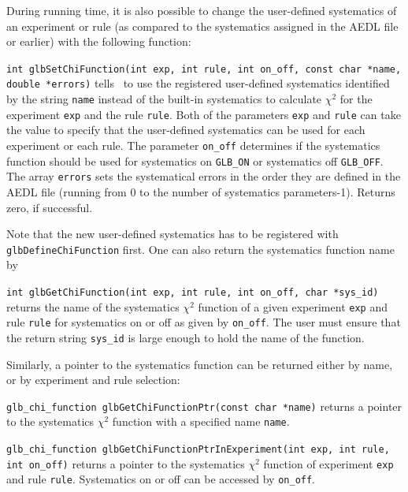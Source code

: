 During running time, it is also possible to change the user-defined systematics of an experiment or
rule (as compared to the systematics assigned in the AEDL file or earlier) with the following function:
\begin{function}
{\tt int glbSetChiFunction(int exp, int rule, int on\_off, const char *name, double *errors)}
 tells \GLOBES\ to use the registered user-defined systematics identified by the string {\tt name}
instead of the built-in systematics
to calculate $\chi^2$ for the experiment {\tt exp} and the rule {\tt rule}. 
Both of the parameters {\tt exp} and {\tt rule} can take the value  to specify that the
user-defined systematics can be used for each experiment or each rule. The parameter 
{\tt on\_off} determines if the systematics function should be used for systematics on
{\tt GLB\_ON} or systematics off {\tt GLB\_OFF}.
The array {\tt errors} sets the systematical errors in the order they
are defined in the AEDL file (running from $0$ to the number of systematics parameters-1). 
Returns zero, if successful.
\end{function}
Note that the new user-defined systematics has to be registered with {\tt glbDefineChiFunction} first. 
One can also return the systematics function name by 
\begin{function}
{\tt int glbGetChiFunction(int exp, int rule, int on\_off, char *sys\_id)}
returns the name of the systematics $\chi^2$ function of a given experiment {\tt exp} and rule {\tt rule} for
systematics on or off as given by {\tt on\_off}. The user must 
ensure that the return string {\tt sys\_id} is large enough to hold the name of the function.
\end{function}
Similarly, a pointer to the systematics function can be returned either by name, or by experiment and rule selection:
\begin{function}
{\tt glb\_chi\_function glbGetChiFunctionPtr(const char *name)}
returns a pointer to the systematics $\chi^2$ function with a specified name {\tt name}.
\end{function}
\begin{function}
{\tt glb\_chi\_function glbGetChiFunctionPtrInExperiment(int exp, int rule, int on\_off)}
returns a pointer to the systematics $\chi^2$ function of experiment {\tt exp} and rule {\tt rule}.
Systematics on or off can be accessed by {\tt on\_off}.
\end{function}

